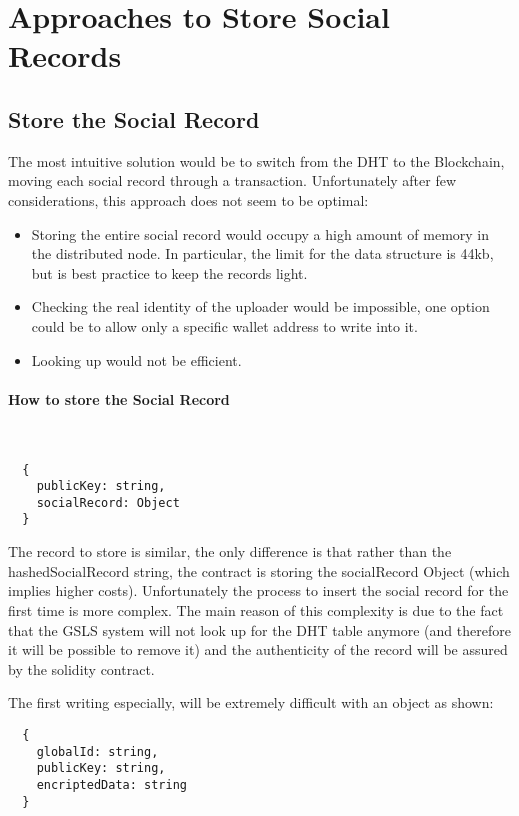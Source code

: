 \section{Approaches to Store Social Records}
\subsection{Store the Social Record}
The most intuitive solution would be to switch from the DHT to the Blockchain, moving each social record through a transaction.
Unfortunately after few considerations, this approach does not seem to be optimal:
\begin{itemize}
	\item Storing the entire social record would occupy a high amount of memory in the distributed node.
In particular, the limit for the data structure is 44kb, but is best practice to keep the records light.
	\item Checking the real identity of the uploader would be impossible, one option could be to allow only a specific wallet address to write into it.
	\item Looking up would not be efficient.
\end{itemize}


\paragraph{How to store the Social Record}\

\begin{lstlisting}
  {
	publicKey: string,
	socialRecord: Object
  }
\end{lstlisting}

The record to store is similar, the only difference is that rather than the hashedSocialRecord string, the contract is storing the socialRecord Object (which implies higher costs).
Unfortunately the process to insert the social record for the first time is more complex.
The main reason of this complexity is due to the fact that the GSLS system will not look up for the DHT table anymore (and therefore it will be possible to remove it) and the authenticity of the record will be assured by the solidity contract.

The first writing especially, will be extremely difficult with an object as shown:

\begin{lstlisting}
  {
	globalId: string,
	publicKey: string,
	encriptedData: string
  }
\end{lstlisting}

